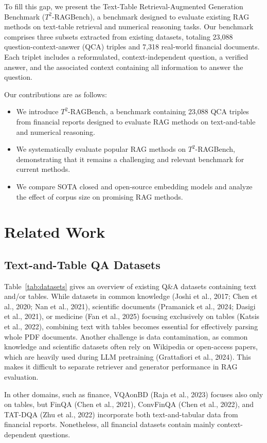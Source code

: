 \documentclass[10pt]{article}
\begin{document}
To fill this gap, we present the Text-Table Retrieval-Augmented Generation Benchmark ($T^{2}$-RAGBench), a benchmark designed to evaluate existing RAG methods on text-table retrieval and numerical reasoning tasks. Our benchmark comprises three subsets extracted from existing datasets, totaling 23,088 question-context-answer (QCA) triples and 7,318 real-world financial documents. Each triplet includes a reformulated, context-independent question, a verified answer, and the associated context containing all information to answer the question.

Our contributions are as follows:
\begin{itemize}
    \item We introduce $T^{2}$-RAGBench, a benchmark containing 23,088 QCA triples from financial reports designed to evaluate RAG methods on text-and-table and numerical reasoning.
    \item We systematically evaluate popular RAG methods on $T^{2}$-RAGBench, demonstrating that it remains a challenging and relevant benchmark for current methods.
    \item We compare SOTA closed and open-source embedding models and analyze the effect of corpus size on promising RAG methods.
\end{itemize}

\section{Related Work}
\subsection*{Text-and-Table QA Datasets}
Table~\ref{tab:datasets} gives an overview of existing Q\&A datasets containing text and/or tables. While datasets in common knowledge (Joshi et al., 2017; Chen et al., 2020; Nan et al., 2021), scientific documents (Pramanick et al., 2024; Dasigi et al., 2021), or medicine (Fan et al., 2025) focusing exclusively on tables (Katsis et al., 2022), combining text with tables becomes essential for effectively parsing whole PDF documents. Another challenge is data contamination, as common knowledge and scientific datasets often rely on Wikipedia or open-access papers, which are heavily used during LLM pretraining (Grattafiori et al., 2024). This makes it difficult to separate retriever and generator performance in RAG evaluation.

In other domains, such as finance, VQAonBD (Raja et al., 2023) focuses also only on tables, but FinQA (Chen et al., 2021), ConvFinQA (Chen et al., 2022), and TAT-DQA (Zhu et al., 2022) incorporate both text-and-tabular data from financial reports. Nonetheless, all financial datasets contain mainly context-dependent questions.
\end{document}
